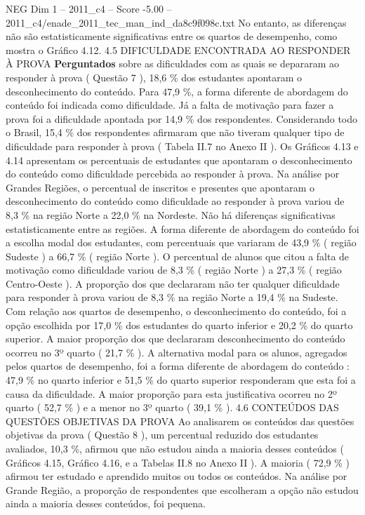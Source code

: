 \begin{textsample}{NEG Dim 1 – 2011\_c4 – Score -5.00 – 2011\_c4/enade\_2011\_tec\_man\_ind\_da8c9f098c.txt}
No entanto, as diferenças não são estatisticamente significativas entre os quartos de desempenho, como mostra o Gráfico 4.12. 4.5 DIFICULDADE ENCONTRADA AO RESPONDER À PROVA \textbf{Perguntados} sobre as dificuldades com as quais se depararam ao responder à prova ( Questão 7 ), 18,6 \% dos estudantes apontaram o desconhecimento do conteúdo.
Para 47,9 \%, a forma diferente de abordagem do conteúdo foi indicada como dificuldade.
Já a falta de motivação para fazer a prova foi a dificuldade apontada por 14,9 \% dos respondentes.
Considerando todo o Brasil, 15,4 \% dos respondentes afirmaram que não tiveram qualquer tipo de dificuldade para responder à prova ( Tabela II.7 no Anexo II ).
Os Gráficos 4.13 e 4.14 apresentam os percentuais de estudantes que apontaram o desconhecimento do conteúdo como dificuldade percebida ao responder à prova.
Na análise por Grandes Regiões, o percentual de inscritos e presentes que apontaram o desconhecimento do conteúdo como dificuldade ao responder à prova variou de 8,3 \% na região Norte a 22,0 \% na Nordeste.
Não há diferenças significativas estatisticamente entre as regiões.
A forma diferente de abordagem do conteúdo foi a escolha modal dos estudantes, com percentuais que variaram de 43,9 \% ( região Sudeste ) a 66,7 \% ( região Norte ).
O percentual de alunos que citou a falta de motivação como dificuldade variou de 8,3 \% ( região Norte ) a 27,3 \% ( região Centro-Oeste ).
A proporção dos que declararam não ter qualquer dificuldade para responder à prova variou de 8,3 \% na região Norte a 19,4 \% na Sudeste.
Com relação aos quartos de desempenho, o desconhecimento do conteúdo, foi a opção escolhida por 17,0 \% dos estudantes do quarto inferior e 20,2 \% do quarto superior.
A maior proporção dos que declararam desconhecimento do conteúdo ocorreu no 3º quarto ( 21,7 \% ).
A alternativa modal para os alunos, agregados pelos quartos de desempenho, foi a forma diferente de abordagem do conteúdo : 47,9 \% no quarto inferior e 51,5 \% do quarto superior responderam que esta foi a causa da dificuldade.
A maior proporção para esta justificativa ocorreu no 2º quarto ( 52,7 \% ) e a menor no 3º quarto ( 39,1 \% ). 4.6 CONTEÚDOS DAS QUESTÕES OBJETIVAS DA PROVA Ao analisarem os conteúdos das questões objetivas da prova ( Questão 8 ), um percentual reduzido dos estudantes avaliados, 10,3 \%, afirmou que não estudou ainda a maioria desses conteúdos ( Gráficos 4.15, Gráfico 4.16, e a Tabelas II.8 no Anexo II ).
A maioria ( 72,9 \% ) afirmou ter estudado e aprendido muitos ou todos os conteúdos.
Na análise por Grande Região, a proporção de respondentes que escolheram a opção não estudou ainda a maioria desses conteúdos, foi pequena.

\end{textsample}

